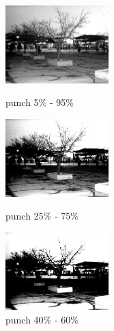 \documentclass[a4paper,UTF8]{article}
\numberwithin{equation}{section}
\begin{document}
\begin{enumerate}[(\romannumeral1)]
\begin{figure}[htbp]
\centering
\begin{minipage}[t]{0.30\textwidth}
\centering
\includegraphics[width=4cm]{night_punch_5.png}
\caption{ punch 5\% - 95\%}
\label{night:5_punch}
\end{minipage}
\centering
\begin{minipage}[t]{0.30\textwidth}
\centering
\includegraphics[width=4cm]{night_punch_25.png}
\caption{ punch 25\% - 75\%}
\label{night:25_punch}
\end{minipage}\centering
\begin{minipage}[t]{0.30\textwidth}
\centering
\includegraphics[width=4cm]{night_punch_40.png}
\caption{ punch 40\% - 60\%}
\label{night:40_punch}
\end{minipage}
\end{figure}


\end{enumerate}
\end{document}
